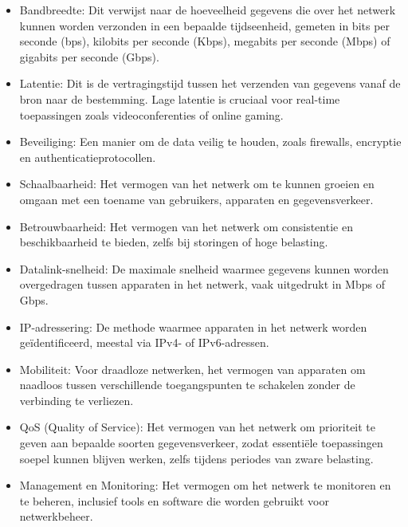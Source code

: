 \begin{itemize}
    \item Bandbreedte: Dit verwijst naar de hoeveelheid gegevens die over het netwerk kunnen worden verzonden in een bepaalde tijdseenheid, gemeten in bits per seconde (bps), kilobits per seconde (Kbps), megabits per seconde (Mbps) of gigabits per seconde (Gbps). \cite{Bandbreedte}
    \item Latentie: Dit is de vertragingstijd tussen het verzenden van gegevens vanaf de bron naar de bestemming. Lage latentie is cruciaal voor real-time toepassingen zoals videoconferenties of online gaming. \cite{Bandbreedte}
    \item Beveiliging: Een manier om de data veilig te houden, zoals firewalls, encryptie en authenticatieprotocollen.
    \item Schaalbaarheid: Het vermogen van het netwerk om te kunnen groeien en omgaan met een toename van gebruikers, apparaten en gegevensverkeer.
    \item Betrouwbaarheid: Het vermogen van het netwerk om consistentie en beschikbaarheid te bieden, zelfs bij storingen of hoge belasting.
    \item Datalink-snelheid: De maximale snelheid waarmee gegevens kunnen worden overgedragen tussen apparaten in het netwerk, vaak uitgedrukt in Mbps of Gbps.\cite{Data}
    \item IP-adressering: De methode waarmee apparaten in het netwerk worden geïdentificeerd, meestal via IPv4- of IPv6-adressen.\cite{IP}
    \item Mobiliteit: Voor draadloze netwerken, het vermogen van apparaten om naadloos tussen verschillende toegangspunten te schakelen zonder de verbinding te verliezen.
    \item QoS (Quality of Service): Het vermogen van het netwerk om prioriteit te geven aan bepaalde soorten gegevensverkeer, zodat essentiële toepassingen soepel kunnen blijven werken, zelfs tijdens periodes van zware belasting.
    \item Management en Monitoring: Het vermogen om het netwerk te monitoren en te beheren, inclusief tools en software die worden gebruikt voor netwerkbeheer.

\end{itemize}
